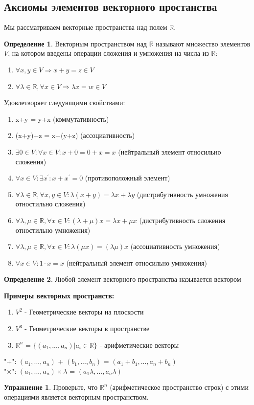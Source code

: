 \documentclass[a4paper, 12pt]{article}
\newcommand{\R}{\mathbb R}
\theoremstyle{definition}
\newtheorem*{definition}{Определение}
\newtheorem*{lalala}{Упражнение}
\begin{document}
  \subsection{Аксиомы элементов векторного простанства}
  Мы рассматриваем векторные пространства над полем $\R$.
  \begin{definition}
    Векторным пространством над $\R$ называют множество элементов $V$, на котором введены операции сложения и умножения на числа из $\R$:
    \begin{enumerate}
      \item $ \forall x,y \in V \Longrightarrow x+y=z \in V$
      \item $\forall \lambda \in \R, \forall x \in V \Longrightarrow \lambda x = w \in V$ 
    \end{enumerate}
    Удовлетворяет следующими свойствами:
    \begin{enumerate}
      \item x+y = y+x (коммутативность)
      \item (x+y)+z = x+(y+z) (ассоциативность)
      \item $\exists 0 \in V: \forall x \in V: x+0 = 0+x = x$ (нейтральный элемент относильно сложения)
      \item $\forall x \in V: \exists x^{\prime}: x + x^{\prime} = 0$ (противоположный элемент)
      \item $\forall \lambda \in \R, \forall x,y \in V: \lambda (x+y) = \lambda x + \lambda y$ (дистрибутивность умножения отностильно сложения)
      \item $\forall \lambda, \mu \in \R, \forall x \in V: (\lambda+\mu)x = \lambda x + \mu x $ (дистрибутивность сложения отностильно умножения)
      \item $\forall \lambda, \mu \in \R, \forall x \in V: \lambda(\mu x) = (\lambda \mu) x $ (ассоциативность умножения)
      \item $\forall x \in V: 1 \cdot x = x$ (нейтральный элемент относильно умножения)
    \end{enumerate}
  \end{definition} 

  \begin{definition}
    Любой элемент векторного пространства называется вектором
  \end{definition} 

  \textbf{Примеры векторных пространств:} 
    \begin{enumerate} 
      \item $V^2$ - Геометрические векторы на плоскости
      \item $V^3$ - Геометрические векторы в пространстве
      \item $\R^n$ = $\{ {(a_1,...,a_n) | a_i \in \R} \}$ - арифметические векторы 
    \end{enumerate}
    "$+$": $(a_1,...,a_n)$ + $(b_1,...,b_n)$ = $(a_1+b_1,...,a_n+b_n)$ \\
    "$\times$": $(a_1,...,a_n) \times \lambda$ = $(a_1\lambda,...,a_n\lambda)$ 
  \begin{lalala}
    Проверьте, что $\R^n$ (арифметическое пространство строк) с этими операциями является векторным пространством. 
  \end{lalala}  
\end{document}
